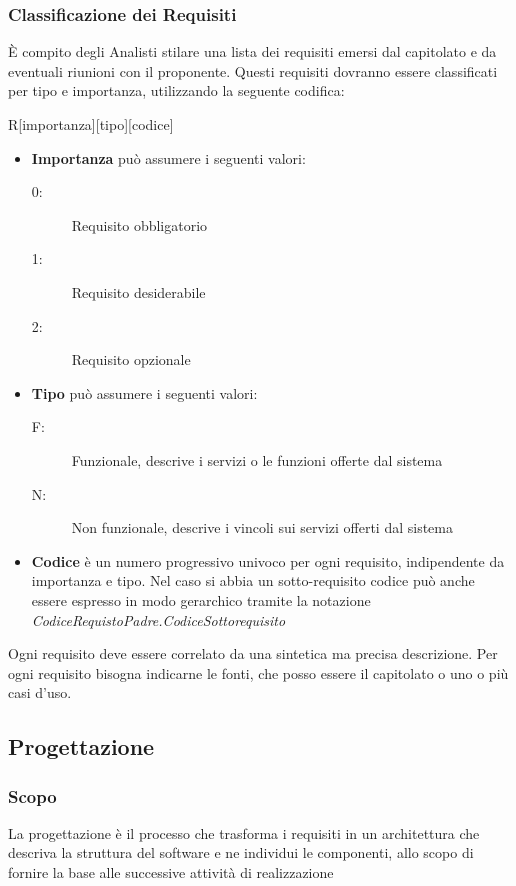 \documentclass[12pt,a4paper]{article}
\begin{document}
\subsubsection{Classificazione dei Requisiti}
È compito degli Analisti stilare una lista dei requisiti emersi dal capitolato e da eventuali riunioni con il proponente. Questi requisiti dovranno essere classificati per tipo e importanza, utilizzando la seguente codifica:
\begin{center}
	R[importanza][tipo][codice]
\end{center}
\begin{itemize}
	\item \textbf{Importanza} può assumere i seguenti valori:
	\begin{description}
		\item[0:] Requisito obbligatorio
		\item[1:] Requisito desiderabile
		\item[2:] Requisito opzionale
	\end{description}
\end{itemize}
\begin{itemize}
	\item \textbf{Tipo} può assumere i seguenti valori:
	\begin{description}
		\item[F:] Funzionale, descrive i servizi o le funzioni offerte dal sistema
		\item[N:] Non funzionale, descrive i vincoli sui servizi offerti dal sistema
	\end{description}
\end{itemize}
\begin{itemize}
	\item \textbf{Codice} è un numero progressivo univoco per ogni requisito, indipendente da importanza e tipo. Nel caso si abbia un sotto-requisito codice può anche essere espresso in modo gerarchico tramite la notazione \textit{CodiceRequistoPadre.CodiceSottorequisito}
\end{itemize}
Ogni requisito deve essere correlato da una sintetica ma precisa descrizione. Per ogni requisito bisogna indicarne le fonti, che posso essere il capitolato o uno o più casi d'uso.

\subsection{Progettazione}

\subsubsection{Scopo}
La progettazione è il processo che trasforma i requisiti in un architettura che descriva la struttura del software e ne individui le componenti, allo scopo di fornire la base alle successive attività di realizzazione
\end{document}
